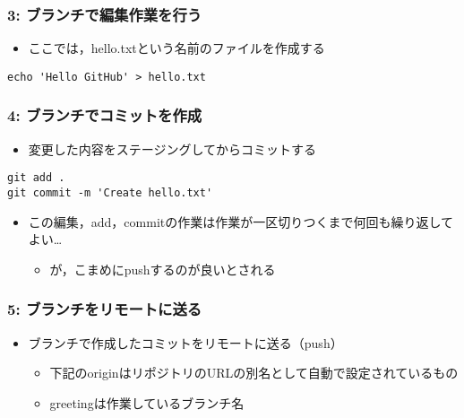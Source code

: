 \documentclass[a4paper,twoside,twocolumn]{bxjsarticle}
\begin{document}
\subsubsection{3: ブランチで編集作業を行う}
\label{sec-2-3-4}
\begin{itemize}
\item ここでは，hello.txtという名前のファイルを作成する
\end{itemize}

\begin{verbatim}
echo 'Hello GitHub' > hello.txt
\end{verbatim}

\subsubsection{4: ブランチでコミットを作成}
\label{sec-2-3-5}
\begin{itemize}
\item 変更した内容をステージングしてからコミットする
\end{itemize}

\begin{verbatim}
git add .
git commit -m 'Create hello.txt'
\end{verbatim}

\begin{itemize}
\item この編集，add，commitの作業は作業が一区切りつくまで何回も繰り返してよい…
\begin{itemize}
\item が，こまめにpushするのが良いとされる
\end{itemize}
\end{itemize}

\subsubsection{5: ブランチをリモートに送る}
\label{sec-2-3-6}
\begin{itemize}
\item ブランチで作成したコミットをリモートに送る（push）
\begin{itemize}
\item 下記のoriginはリポジトリのURLの別名として自動で設定されているもの
\item greetingは作業しているブランチ名
\end{itemize}
\end{itemize}
\end{document}
